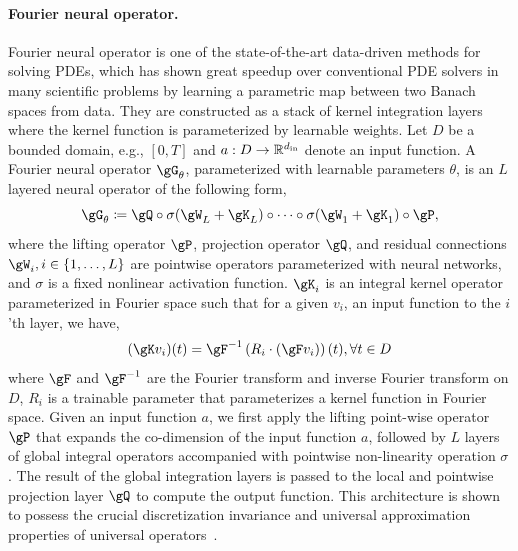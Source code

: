 \vspace{-0.1in}
\paragraph{Fourier neural operator.}
Fourier neural operator \cite{li2020fourier} is one of the state-of-the-art data-driven methods for solving PDEs, which has shown great speedup over conventional PDE solvers in many scientific problems by learning a parametric map between two Banach spaces from data. They are constructed as a stack of kernel integration layers where the kernel function is parameterized by learnable weights. Let $D$ be a bounded domain, e.g., $[0,T]$ and $a: D\rightarrow \mathbb{R}^{d_{\mathrm{in}}}$ denote an input function. A Fourier neural operator $\gG_{\theta}$, parameterized with learnable parameters $\theta$, is an $L$ layered neural operator of the following form,
\begin{equation}
    \gG_{\theta} \coloneqq \gQ \circ \sigma(\gW_{L} + \gK_{L})\circ \dots \circ \sigma(\gW_{1} + \gK_{1}) \circ \gP,
    \label{eq:fno_layers}
\end{equation}
where the lifting operator $\gP$, projection operator $\gQ$, and residual connections $\gW_{i}, i\in \{1, \dots, L\}$ are pointwise operators parameterized with neural networks, and $\sigma$ is a fixed nonlinear activation function. $\gK_{i}$ is an integral kernel operator parameterized in Fourier space such that for a given $v_i$, an input function to the $i$'th layer, we have,
\begin{equation}
    (\gK v_i)(t) = \gF^{-1}\left(R_i \cdot (\gF v_i)\right)(t), \forall t\in D 
    \label{eq:fourier_conv}
\end{equation}
where $\gF$ and $\gF^{-1}$ are the Fourier transform and inverse Fourier transform on $D$, $R_i$ is a trainable parameter that parameterizes a kernel function in Fourier space. Given an input function $a$, we first apply the lifting point-wise operator $\gP$ that expands the co-dimension of the input function $a$, followed by $L$ layers of global integral operators accompanied with pointwise non-linearity operation $\sigma$. The result of the global integration layers is passed to the local and pointwise projection layer $\gQ$ to compute the output function. This architecture is shown to possess the crucial discretization invariance and universal approximation properties of universal operators~\citep{kovachki2021universal,kovachki2021neural}. 





